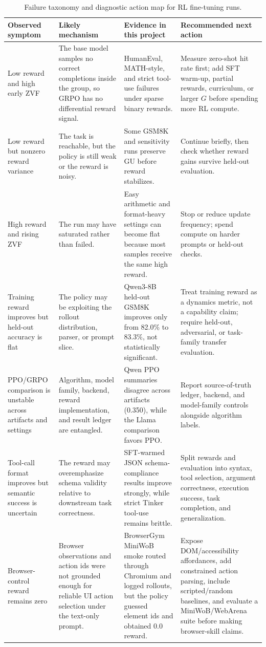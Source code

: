 \documentclass[12pt,a4paper]{report}
\begin{document}
\begin{table}[ht]
\centering
\caption{Failure taxonomy and diagnostic action map for RL fine-tuning runs.}
\label{tab:failure-taxonomy}
\small
\footnotesize
\begin{tabularx}{\textwidth}{p{3.15cm}p{3.35cm}p{3.7cm}X}
\toprule
Observed symptom & Likely mechanism & Evidence in this project & Recommended next action\\
\midrule
Low reward and high early ZVF & The base model samples no correct completions inside the group, so GRPO has no differential reward signal. & HumanEval, MATH-style, and strict tool-use failures under sparse binary rewards. & Measure zero-shot hit rate first; add SFT warm-up, partial rewards, curriculum, or larger $G$ before spending more RL compute.\\
Low reward but nonzero reward variance & The task is reachable, but the policy is still weak or the reward is noisy. & Some GSM8K and sensitivity runs preserve GU before reward stabilizes. & Continue briefly, then check whether reward gains survive held-out evaluation.\\
High reward and rising ZVF & The run may have saturated rather than failed. & Easy arithmetic and format-heavy settings can become flat because most samples receive the same high reward. & Stop or reduce update frequency; spend compute on harder prompts or held-out checks.\\
Training reward improves but held-out accuracy is flat & The policy may be exploiting the rollout distribution, parser, or prompt slice. & Qwen3-8B held-out GSM8K improves only from 82.0\% to 83.3\%, not statistically significant. & Treat training reward as a dynamics metric, not a capability claim; require held-out, adversarial, or task-family transfer evaluation.\\
PPO/GRPO comparison is unstable across artifacts and settings & Algorithm, model family, backend, reward implementation, and result ledger are entangled. & Qwen PPO summaries disagree across artifacts (0.350), while the Llama comparison favors PPO. & Report source-of-truth ledger, backend, and model-family controls alongside algorithm labels.\\
Tool-call format improves but semantic success is uncertain & The reward may overemphasize schema validity relative to downstream task correctness. & SFT-warmed JSON schema-compliance results improve strongly, while strict Tinker tool-use remains brittle. & Split rewards and evaluation into syntax, tool selection, argument correctness, execution success, task completion, and generalization.\\
Browser-control reward remains zero & Browser observations and action ids were not grounded enough for reliable UI action selection under the text-only prompt. & BrowserGym MiniWoB smoke routed through Chromium and logged rollouts, but the policy guessed element ids and obtained 0.0 reward. & Expose DOM/accessibility affordances, add constrained action parsing, include scripted/random baselines, and evaluate a MiniWoB/WebArena suite before making browser-skill claims.\\
\bottomrule
\end{tabularx}
\end{table}
\end{document}
